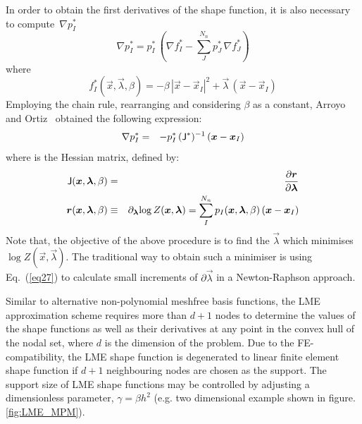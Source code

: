 In order to obtain the first derivatives of the shape function, it is  also necessary to compute~$\nabla p^*_I$ 
\begin{equation}
  \label{eq:LME-grad-p}
\nabla p^*_I=p^*_I  \, \left(\nabla f^*_I-\sum_J^{N_n} p^*_J \, \nabla f^*_J\right)
\end{equation}
where
\begin{equation}
  \label{eq:LME-f}
f^*_I(\vec{x},  \vec{\lambda},\beta)=-\beta \, |\vec{x}-\vec{x}_I|^2 + \vec{\lambda}   \,  (\vec{x}-\vec{x}_I)
\end{equation}
Employing the chain rule, rearranging and considering $\beta$ as a constant, Arroyo and Ortiz~\cite{Arroyo2006} obtained the following expression:
\begin{eqnarray}
\nabla p^*_I &=& -p^*_I \,  (\tens{J}^*)^{-1} \,  (\vec{x} - \vec{x}_I) \label{eq26} 
\end{eqnarray}
where  is the Hessian matrix, defined by:
\begin{eqnarray}
\tens{J}(\vec{x},  \vec{\lambda},\beta) &=& \frac{\partial \vec{r}}{\partial  \vec{\lambda}} \label{eq27} \\ 
\vec{r}(\vec{x},\vec{\lambda},\beta) &\equiv& \partial_{\vec{\lambda}}{\log{ Z( \vec{x},\vec{\lambda}})} 
  =\sum_I^{N_n} p_I(\vec{x},\vec{\lambda},\beta) \, (\vec{x} - \vec{x}_I) \label{eq28} 
\end{eqnarray}
Note that, the objective of the above procedure is to find the
$\vec{\lambda}$ which minimises  $\log Z(\vec{x}, \vec{\lambda})$. The
traditional way to obtain such a minimiser  is using Eq.~(\ref{eq27})
to calculate small increments of $\partial\vec{\lambda}$ in a
Newton-Raphson approach.

Similar to alternative non-polynomial meshfree basis functions, the
LME approximation scheme requires more than $d+1$ nodes to determine
the values of the shape functions as well as their derivatives at any
point in the convex hull of the nodal set, where $d$ is the dimension
of the problem. Due to the FE-compatibility, the LME shape function is
degenerated to linear finite element shape function if $d+1$
neighbouring nodes are chosen as the support. The support size of LME
shape functions may be controlled by adjusting a dimensionless
parameter, $\gamma=\beta h^2$ (e.g. two dimensional example shown in
figure. \ref{fig:LME_MPM})\cite{Arroyo2006}.


